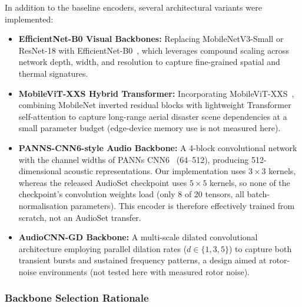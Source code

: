 \documentclass[journal]{IEEEtran}
\begin{document}
In addition to the baseline encoders, several architectural variants were implemented:
\begin{itemize}
    \item \textbf{EfficientNet-B0 Visual Backbones:} Replacing MobileNetV3-Small or ResNet-18 with EfficientNet-B0~\cite{tan2019efficientnet}, which leverages compound scaling across network depth, width, and resolution to capture fine-grained spatial and thermal signatures.
    \item \textbf{MobileViT-XXS Hybrid Transformer:} Incorporating MobileViT-XXS~\cite{mehta2022mobilevit}, combining MobileNet inverted residual blocks with lightweight Transformer self-attention to capture long-range aerial disaster scene dependencies at a small parameter budget (edge-device memory use is not measured here).
    \item \textbf{PANNS-CNN6-style Audio Backbone:} A 4-block convolutional network with the channel widths of PANNs CNN6~\cite{kong2020panns} (64--512), producing 512-dimensional acoustic representations. Our implementation uses $3\times3$ kernels, whereas the released AudioSet checkpoint uses $5\times5$ kernels, so none of the checkpoint's convolution weights load (only 8 of 20 tensors, all batch-normalisation parameters). This encoder is therefore effectively trained from scratch, not an AudioSet transfer.
    \item \textbf{AudioCNN-GD Backbone:} A multi-scale dilated convolutional architecture employing parallel dilation rates ($d \in \{1, 3, 5\}$) to capture both transient bursts and sustained frequency patterns, a design aimed at rotor-noise environments (not tested here with measured rotor noise).
\end{itemize}

\subsubsection{Backbone Selection Rationale}
\label{sec:backbone_selection}
\end{document}
